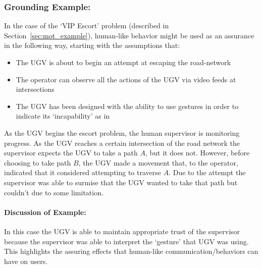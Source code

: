 \subsubsection{Grounding Example:}
In the case of the `VIP Escort' problem (described in Section~\ref{sec:mot_example}), human-like behavior might be used as an assurance in the following way, starting with the assumptions that:

\begin{itemize}
    \item The UGV is about to begin an attempt at escaping the road-network
    \item The operator can observe all the actions of the UGV via video feeds at intersections
    \item The UGV has been designed with the ability to use gestures in order to indicate its `incapability' as in \cite{Kwon2018-xt}
\end{itemize}

As the UGV begins the escort problem, the human supervisor is monitoring progress. As the UGV reaches a certain intersection of the road network the supervisor expects the UGV to take a path $A$, but it does not. However, before choosing to take path $B$, the UGV made a movement that, to the operator, indicated that it considered attempting to traverse $A$. Due to the attempt the supervisor was able to surmise that the UGV wanted to take that path but couldn't due to some limitation.

\paragraph{\textbf{Discussion of Example:}} In this case the UGV is able to maintain appropriate trust of the supervisor because the supervisor was able to interpret the `gesture' that UGV was using. This highlights the assuring effects that human-like communication/behaviors can have on users.
